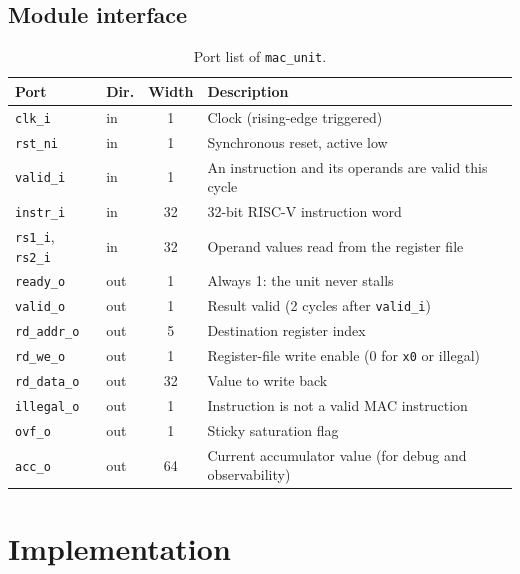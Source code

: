\documentclass[11pt,a4paper]{report}
\newcommand{\code}[1]{\texttt{#1}}
\begin{document}
\section{Module interface}
\begin{table}[H]
  \centering
  \caption{Port list of \code{mac\_unit}.}
  \label{tab:ports}
  \small
  \begin{tabularx}{\linewidth}{@{}llcX@{}}
    \toprule
    Port & Dir. & Width & Description \\
    \midrule
    \code{clk\_i}      & in  & 1  & Clock (rising-edge triggered) \\
    \code{rst\_ni}     & in  & 1  & Synchronous reset, active low \\
    \code{valid\_i}    & in  & 1  & An instruction and its operands are valid this cycle \\
    \code{instr\_i}    & in  & 32 & 32-bit RISC-V instruction word \\
    \code{rs1\_i}, \code{rs2\_i} & in & 32 & Operand values read from the register file \\
    \code{ready\_o}    & out & 1  & Always 1: the unit never stalls \\
    \code{valid\_o}    & out & 1  & Result valid (2 cycles after \code{valid\_i}) \\
    \code{rd\_addr\_o} & out & 5  & Destination register index \\
    \code{rd\_we\_o}   & out & 1  & Register-file write enable (0 for \code{x0} or illegal) \\
    \code{rd\_data\_o} & out & 32 & Value to write back \\
    \code{illegal\_o}  & out & 1  & Instruction is not a valid MAC instruction \\
    \code{ovf\_o}      & out & 1  & Sticky saturation flag \\
    \code{acc\_o}      & out & 64 & Current accumulator value (for debug and observability) \\
    \bottomrule
  \end{tabularx}
\end{table}

\chapter{Implementation}\label{ch:impl}
\end{document}
